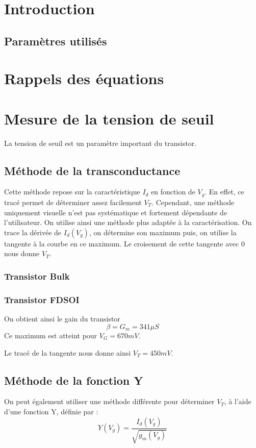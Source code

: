 \documentclass[a4paper,11pt]{report}
\begin{document}


\chapter*{Introduction}


\section*{Paramètres utilisés}

\chapter{Rappels des équations}

\chapter{Mesure de la tension de seuil}
La tension de seuil est un paramètre important du transistor. %
\section{Méthode de la transconductance}

Cette méthode repose sur la caractéristique $I_d$ en fonction de $V_g$. En effet, ce tracé permet de déterminer assez facilement $V_T$. Cependant, une méthode uniquement visuelle n'est pas systématique et fortement dépendante de l'utilisateur. On utilise ainsi une méthode plus adaptée à la caractérisation. On trace la dérivée de $I_d(V_g)$, on détermine son maximum puis, on utilise la tangente à la courbe en ce maximum. Le croisement de cette tangente avec 0 nous donne $V_T$.

\subsection{Transistor Bulk}

\subsection{Transistor FDSOI}
\noindent On obtient ainsi le gain du transistor \[\beta=G_m=341\mu S\] Ce maximum est atteint pour $V_G=670mV$.

Le tracé de la tangente nous donne ainsi $V_T=450mV$.

\section{Méthode de la fonction Y}
On peut également utiliser une méthode différente pour déterminer $V_T$, à l'aide d'une fonction Y, définie par :
\[Y(V_g)=\dfrac{I_d(V_g)}{\sqrt{g_m(V_g)}}\]
\end{document}
